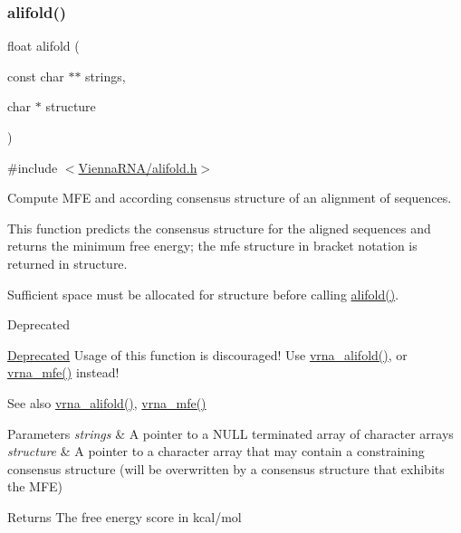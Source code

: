 \subsubsection{\texorpdfstring{alifold()}{alifold()}}
{\footnotesize\ttfamily float alifold (\begin{DoxyParamCaption}\item[{const char $\ast$$\ast$}]{strings,  }\item[{char $\ast$}]{structure }\end{DoxyParamCaption})}



{\ttfamily \#include $<$\hyperlink{alifold_8h}{Vienna\+R\+N\+A/alifold.\+h}$>$}



Compute M\+FE and according consensus structure of an alignment of sequences. 

This function predicts the consensus structure for the aligned \textquotesingle{}sequences\textquotesingle{} and returns the minimum free energy; the mfe structure in bracket notation is returned in \textquotesingle{}structure\textquotesingle{}.

Sufficient space must be allocated for \textquotesingle{}structure\textquotesingle{} before calling \hyperlink{group__consensus__mfe__fold_ga4cf00f0659e5f0480335d69e797f05b1}{alifold()}.

\begin{DoxyRefDesc}{Deprecated}
\item[\hyperlink{deprecated__deprecated000012}{Deprecated}]Usage of this function is discouraged! Use \hyperlink{group__consensus__mfe__fold_ga6c9d3bef3e92c6d423ffac9f981418c1}{vrna\+\_\+alifold()}, or \hyperlink{group__mfe__fold_gabd3b147371ccf25c577f88bbbaf159fd}{vrna\+\_\+mfe()} instead! \end{DoxyRefDesc}
\begin{DoxySeeAlso}{See also}
\hyperlink{group__consensus__mfe__fold_ga6c9d3bef3e92c6d423ffac9f981418c1}{vrna\+\_\+alifold()}, \hyperlink{group__mfe__fold_gabd3b147371ccf25c577f88bbbaf159fd}{vrna\+\_\+mfe()}
\end{DoxySeeAlso}

\begin{DoxyParams}{Parameters}
{\em strings} & A pointer to a N\+U\+LL terminated array of character arrays \\
\hline
{\em structure} & A pointer to a character array that may contain a constraining consensus structure (will be overwritten by a consensus structure that exhibits the M\+FE) \\
\hline
\end{DoxyParams}
\begin{DoxyReturn}{Returns}
The free energy score in kcal/mol 
\end{DoxyReturn}
\mbox{\label{group__consensus__mfe__fold_gadbd3b0b1c144cbfb4efe704b2b260f96}} 
